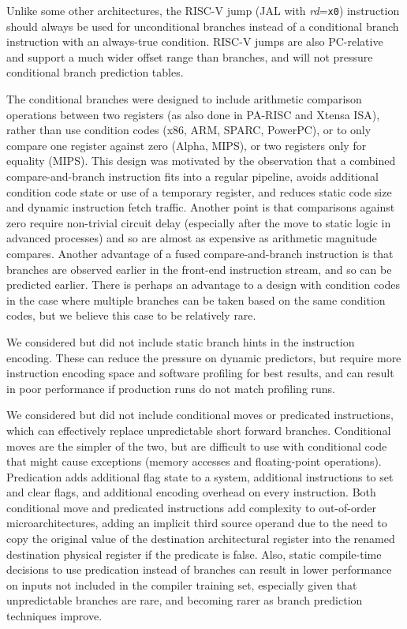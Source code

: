 Unlike some other architectures, the RISC-V jump (JAL with {\em
  rd}={\tt x0}) instruction should always be used for unconditional
branches instead of a conditional branch instruction with an always-true
condition.  RISC-V jumps are also PC-relative and support a much
wider offset range than branches, and will not pressure conditional
branch prediction tables.

\begin{commentary}
The conditional branches were designed to include arithmetic
comparison operations between two registers (as also done in PA-RISC
and Xtensa ISA), rather than use condition codes (x86, ARM, SPARC,
PowerPC), or to only compare one register against zero (Alpha, MIPS),
or two registers only for equality (MIPS).  This design was motivated
by the observation that a combined compare-and-branch instruction fits
into a regular pipeline, avoids additional condition code state or use
of a temporary register, and reduces static code size and dynamic
instruction fetch traffic.  Another point is that comparisons against
zero require non-trivial circuit delay (especially after the move to
static logic in advanced processes) and so are almost as expensive as
arithmetic magnitude compares.  Another advantage of a fused
compare-and-branch instruction is that branches are observed earlier
in the front-end instruction stream, and so can be predicted earlier.
There is perhaps an advantage to a design with condition codes in the
case where multiple branches can be taken based on the same condition
codes, but we believe this case to be relatively rare.

We considered but did not include static branch hints in the
instruction encoding.  These can reduce the pressure on dynamic
predictors, but require more instruction encoding space and
software profiling for best results, and can result in poor
performance if production runs do not match profiling runs.

We considered but did not include conditional moves or predicated
instructions, which can effectively replace unpredictable short
forward branches.  Conditional moves are the simpler of the two, but
are difficult to use with conditional code that might cause exceptions
(memory accesses and floating-point operations).  Predication adds
additional flag state to a system, additional instructions to set and
clear flags, and additional encoding overhead on every instruction.
Both conditional move and predicated instructions add complexity to
out-of-order microarchitectures, adding an implicit third source
operand due to the need to copy the original value of the destination
architectural register into the renamed destination physical register
if the predicate is false.  Also, static compile-time decisions to use
predication instead of branches can result in lower performance on
inputs not included in the compiler training set, especially given
that unpredictable branches are rare, and becoming rarer as branch
prediction techniques improve.


\end{commentary}
